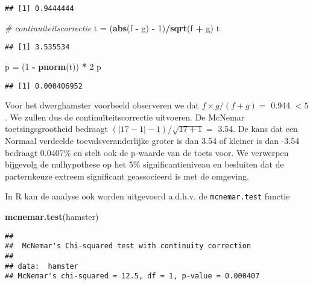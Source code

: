 \documentclass[12pt,dutch,coursenotes]{book}
\newenvironment{Shaded}{\begin{snugshade}}{\end{snugshade}}
\newcommand{\KeywordTok}[1]{\textcolor[rgb]{0.13,0.29,0.53}{\textbf{#1}}}
\newcommand{\DecValTok}[1]{\textcolor[rgb]{0.00,0.00,0.81}{#1}}
\newcommand{\StringTok}[1]{\textcolor[rgb]{0.31,0.60,0.02}{#1}}
\newcommand{\CommentTok}[1]{\textcolor[rgb]{0.56,0.35,0.01}{\textit{#1}}}
\newcommand{\OperatorTok}[1]{\textcolor[rgb]{0.81,0.36,0.00}{\textbf{#1}}}
\newcommand{\NormalTok}[1]{#1}
\theoremstyle{definition}
\theoremstyle{definition}
\theoremstyle{definition}
\theoremstyle{remark}
\begin{document}
\begin{verbatim}
## [1] 0.9444444
\end{verbatim}

\begin{Shaded}
\begin{Highlighting}[]
\CommentTok{# continuiteitscorrectie}
\NormalTok{t =}\StringTok{ }\NormalTok{(}\KeywordTok{abs}\NormalTok{(f }\OperatorTok{-}\StringTok{ }\NormalTok{g) }\OperatorTok{-}\StringTok{ }\DecValTok{1}\NormalTok{)}\OperatorTok{/}\KeywordTok{sqrt}\NormalTok{(f }\OperatorTok{+}\StringTok{ }\NormalTok{g)}
\NormalTok{t}
\end{Highlighting}
\end{Shaded}

\begin{verbatim}
## [1] 3.535534
\end{verbatim}

\begin{Shaded}
\begin{Highlighting}[]
\NormalTok{p =}\StringTok{ }\NormalTok{(}\DecValTok{1} \OperatorTok{-}\StringTok{ }\KeywordTok{pnorm}\NormalTok{(t)) }\OperatorTok{*}\StringTok{ }\DecValTok{2}
\NormalTok{p}
\end{Highlighting}
\end{Shaded}

\begin{verbatim}
## [1] 0.000406952
\end{verbatim}

Voor het dwerghamster voorbeeld observeren we dat \(f\times g/(f+g)=\)
0.944 \(<5\). We zullen dus de continuïteitscorrectie uitvoeren. De
McNemar toetsingsgrootheid bedraagt
\((\vert 17-1 \vert -1)/\sqrt{17+1}=\) 3.54. De kans dat een Normaal
verdeelde toevalsveranderlijke groter is dan 3.54 of kleiner is dan
-3.54 bedraagt 0.0407\% en stelt ook de p-waarde van de toets voor. We
verwerpen bijgevolg de nulhypothese op het 5\% significantieniveau en
besluiten dat de parternkeuze extreem significant geassocieerd is met de
omgeving.

In R kan de analyse ook worden uitgevoerd a.d.h.v. de
\texttt{mcnemar.test} functie

\begin{Shaded}
\begin{Highlighting}[]
\KeywordTok{mcnemar.test}\NormalTok{(hamster)}
\end{Highlighting}
\end{Shaded}

\begin{verbatim}
## 
##  McNemar's Chi-squared test with continuity correction
## 
## data:  hamster
## McNemar's chi-squared = 12.5, df = 1, p-value = 0.000407
\end{verbatim}
\end{document}
